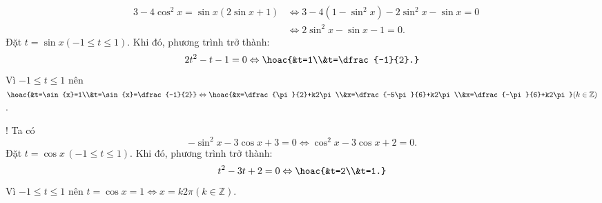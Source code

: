 \begin{bt}
{\begin{listEX}[2]
\begin{eqnarray*}
				& 3-4\cos^2{x}=\sin{x}(2\sin{x}+1) & \Leftrightarrow 3-4(1-\sin^2{x})-2\sin^2{x}-\sin{x}=0\\
				& & \Leftrightarrow 2\sin^2{x}-\sin{x}-1=0.
			\end{eqnarray*}
			Đặt $t=\sin{x}(-1\le t\le 1)$. Khi đó, phương trình trở thành:
			$$
			2t^2-t-1=0 \Leftrightarrow \hoac{&t=1\\&t=\dfrac{-1}{2}.}
			$$
			Vì $-1\le t\le 1$ nên $\hoac{&t=\sin{x}=1\\&t=\sin{x}=\dfrac{-1}{2}}\Leftrightarrow\hoac{&x=\dfrac{\pi}{2}+k2\pi\\&x=\dfrac{-5\pi}{6}+k2\pi\\&x=\dfrac{-\pi}{6}+k2\pi}(k\in\mathbb{Z})$.
			\item! Ta có
			$$
			-\sin^2{x}-3\cos{x}+3=0 \Leftrightarrow \cos^2{x}-3\cos{x}+2=0.$$
			Đặt $t=\cos{x}\,(-1\le t\le 1)$. Khi đó, phương trình trở thành:
			$$
			t^2-3t+2=0 \Leftrightarrow \hoac{&t=2\\&t=1.}
			$$
			Vì $-1\le t\le 1$ nên $t=\cos{x}=1\Leftrightarrow x=k2\pi(k\in\mathbb{Z})$.
		\end{listEX}
	}
\end{bt}

